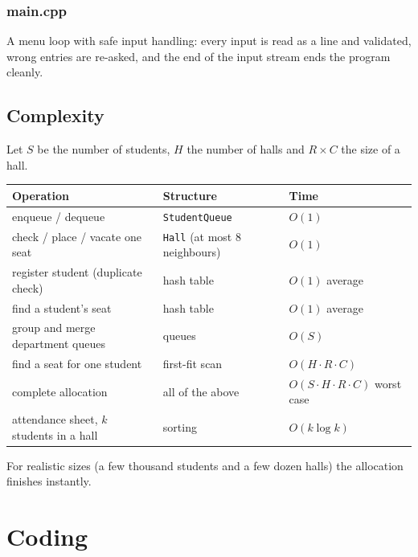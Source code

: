\documentclass[12pt,a4paper]{report}
\begin{document}
\subsection{main.cpp}
A menu loop with safe input handling: every input is read as a line and validated, wrong entries are re-asked, and the end of the input stream ends the program cleanly.

\section{Complexity}
Let $S$ be the number of students, $H$ the number of halls and $R\times C$ the size of a hall.
\begin{center}
{\small
\begin{tabular}{p{5.4cm}p{3.9cm}p{4.3cm}}
\toprule
\textbf{Operation} & \textbf{Structure} & \textbf{Time}\\
\midrule
enqueue / dequeue & \texttt{StudentQueue} & $O(1)$\\
check / place / vacate one seat & \texttt{Hall} (at most 8 neighbours) & $O(1)$\\
register student (duplicate check) & hash table & $O(1)$ average\\
find a student's seat & hash table & $O(1)$ average\\
group and merge department queues & queues & $O(S)$\\
find a seat for one student & first-fit scan & $O(H\cdot R\cdot C)$\\
complete allocation & all of the above & $O(S\cdot H\cdot R\cdot C)$ worst case\\
attendance sheet, $k$ students in a hall & sorting & $O(k\log k)$\\
\bottomrule
\end{tabular}}
\end{center}
For realistic sizes (a few thousand students and a few dozen halls) the allocation finishes instantly.

\chapter{Coding}
\end{document}
